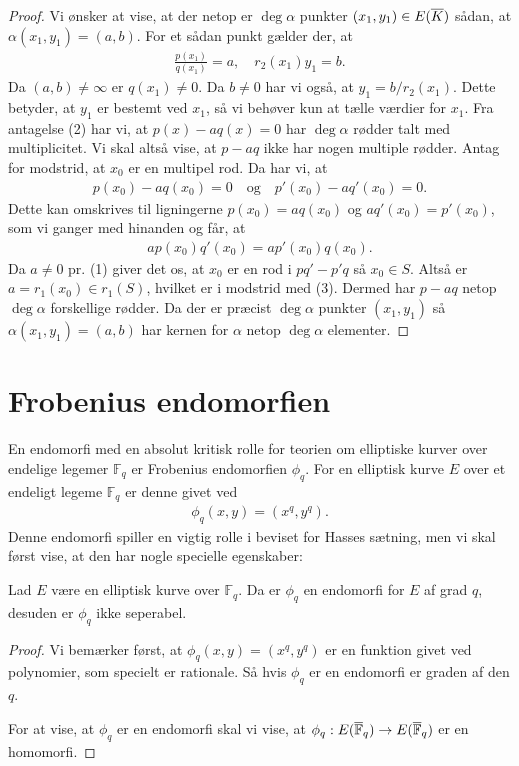 \begin{proof}
Vi ønsker at vise, at der netop er $\deg \alpha$ punkter $(x_1, y_1) \in E(\overline{K})$ sådan,
at $\alpha(x_1, y_1) = (a, b)$. For et sådan punkt gælder der, at 
\begin{align*}
	\frac{p(x_1)}{q(x_1)} = a, \quad r_2(x_1) y_1 = b.
\end{align*}
Da $(a, b) \neq \infty$ er $q(x_1) \neq 0$. %
Da $b \neq 0$ har vi også, at $y_1 = b / r_2(x_1)$. Dette betyder, at $y_1$ er bestemt
ved $x_1$, så vi behøver kun at tælle værdier for $x_1$. Fra antagelse (2) har vi, at 
$p(x) - aq(x) = 0$ har $\deg \alpha$ rødder talt med multiplicitet. Vi skal altså vise,
at $p-aq$ ikke har nogen multiple rødder. Antag for modstrid, at $x_0$ er en multipel
rod. Da har vi, at
\begin{align*}
	p(x_0) - aq(x_0) = 0 \quad \text{og} \quad p'(x_0) - aq'(x_0) = 0.
\end{align*}
Dette kan omskrives til ligningerne $p(x_0)=aq(x_0)$ og $aq'(x_0)=p'(x_0)$, 
som vi ganger med hinanden og får, at 
\begin{align*}
	a p(x_0)q'(x_0) = ap'(x_0)q(x_0).
\end{align*} 
Da $a \neq 0$ pr. (1) giver det os, at $x_0$ er en rod i $pq'-p'q$ så $x_0 \in S$.
Altså er $a=r_1(x_0) \in r_1(S)$, hvilket er i modstrid med (3). Dermed har 
$p-aq$ netop $\deg \alpha$ forskellige rødder. Da der er præcist $\deg \alpha$ 
punkter $(x_1, y_1)$ så $\alpha(x_1, y_1) = (a, b)$ har kernen for $\alpha$ netop
$\deg \alpha$ elementer.
\end{proof}


\section{Frobenius endomorfien}

En endomorfi med en absolut kritisk rolle for teorien om elliptiske kurver over endelige legemer $\mathbb{F}_q$ er Frobenius endomorfien $\phi_q$. For en elliptisk kurve $E$ over et endeligt legeme $\mathbb{F}_q$ er denne givet ved
\begin{align}
	\phi_q (x, y) = (x^q, y^q).
\end{align}
Denne endomorfi spiller en vigtig rolle i beviset for Hasses sætning, men vi skal først vise, at den har nogle specielle egenskaber:

\begin{lemma}
\label{lemma_end_degree_not_sep}
Lad $E$ være en elliptisk kurve over $\mathbb{F}_q$. Da er $\phi_q$ en 
endomorfi for $E$ af grad $q$, desuden er $\phi_q$ ikke seperabel.
\end{lemma}
\begin{proof}
Vi bemærker først, at $\phi_q(x, y) = (x^q, y^q)$ er en funktion givet ved polynomier, som specielt er rationale. Så hvis $\phi_q$ er en endomorfi er graden af den $q$.

For at vise, at $\phi_q$ er en endomorfi skal vi vise, at $\phi_q : E(\overline{\mathbb{F}}_q) \to E(\overline{\mathbb{F}}_q)$ er en homomorfi.
\end{proof}

